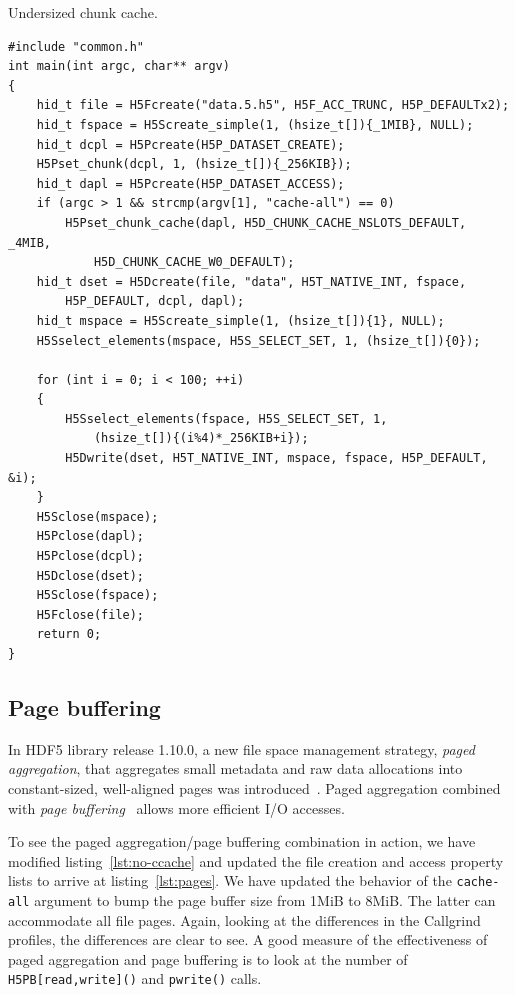 \begin{listing}
\centering
\caption{Undersized chunk cache.}
\label{lst:no-ccache}
\begin{verbatim}
#include "common.h"
int main(int argc, char** argv)
{
    hid_t file = H5Fcreate("data.5.h5", H5F_ACC_TRUNC, H5P_DEFAULTx2);
    hid_t fspace = H5Screate_simple(1, (hsize_t[]){_1MIB}, NULL);
    hid_t dcpl = H5Pcreate(H5P_DATASET_CREATE);
    H5Pset_chunk(dcpl, 1, (hsize_t[]){_256KIB});
    hid_t dapl = H5Pcreate(H5P_DATASET_ACCESS);
    if (argc > 1 && strcmp(argv[1], "cache-all") == 0)
        H5Pset_chunk_cache(dapl, H5D_CHUNK_CACHE_NSLOTS_DEFAULT, _4MIB,
            H5D_CHUNK_CACHE_W0_DEFAULT);
    hid_t dset = H5Dcreate(file, "data", H5T_NATIVE_INT, fspace,
        H5P_DEFAULT, dcpl, dapl);
    hid_t mspace = H5Screate_simple(1, (hsize_t[]){1}, NULL);
    H5Sselect_elements(mspace, H5S_SELECT_SET, 1, (hsize_t[]){0});

    for (int i = 0; i < 100; ++i)
    {
        H5Sselect_elements(fspace, H5S_SELECT_SET, 1,
            (hsize_t[]){(i%4)*_256KIB+i});
        H5Dwrite(dset, H5T_NATIVE_INT, mspace, fspace, H5P_DEFAULT, &i);
    }
    H5Sclose(mspace);
    H5Pclose(dapl);
    H5Pclose(dcpl);
    H5Dclose(dset);
    H5Sclose(fspace);
    H5Fclose(file);
    return 0;
}
\end{verbatim}
\end{listing}

\subsection{Page buffering}\label{sub-sec:page-buf}

In HDF5 library release 1.10.0, a new file space management strategy, \textit{paged aggregation}, that aggregates small metadata and raw data allocations into constant-sized, well-aligned pages was introduced~\cite{rfc20120523}. Paged aggregation combined with \textit{page buffering}~\cite{rfc20150709} allows more efficient I/O accesses.

To see the paged aggregation/page buffering combination in action, we have modified listing~\ref{lst:no-ccache} and updated the file creation and access property lists to arrive at listing~\ref{lst:pages}. We have updated the behavior of the \texttt{cache-all} argument to bump the page buffer size from 1MiB to 8MiB. The latter can accommodate all file pages. Again, looking at the differences in the Callgrind profiles, the differences are clear to see. A good measure of the effectiveness of paged aggregation and page buffering is to look at the number of \texttt{H5PB[read,write]()} and \texttt{pwrite()} calls.

